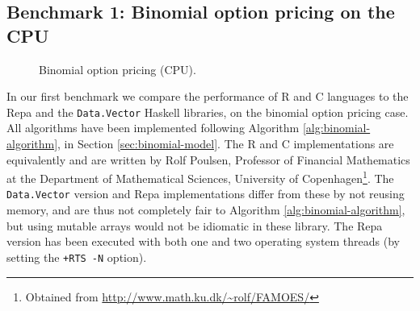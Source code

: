 \subsection{Benchmark 1: Binomial option pricing on the CPU}
\begin{figure}
	\centering
\begin{adjustbox}{minipage=1.3\textwidth,margin=0pt \smallskipamount,center}
\end{adjustbox}
\caption{Binomial option pricing (CPU).}
\label{fig:binomial-cpu}
\end{figure}

In our first benchmark we compare the performance of R and C languages
to the Repa and the \texttt{Data.Vector} Haskell libraries, on the
binomial option pricing case. All algorithms have been implemented
following Algorithm \ref{alg:binomial-algorithm}, in Section
\ref{sec:binomial-model}. The R and C implementations are equivalently
and are written by Rolf Poulsen, Professor of Financial Mathematics at
the Department of Mathematical Sciences, University of
Copenhagen\footnote{Obtained from
  \url{http://www.math.ku.dk/~rolf/FAMOES/}}. The \texttt{Data.Vector}
version and Repa implementations differ from these by not reusing
memory, and are thus not completely fair to Algorithm
\ref{alg:binomial-algorithm}, but using mutable arrays would not be
idiomatic in these library. The Repa version has been executed with
both one and two operating system threads (by setting the \texttt{+RTS
  -N} option).


